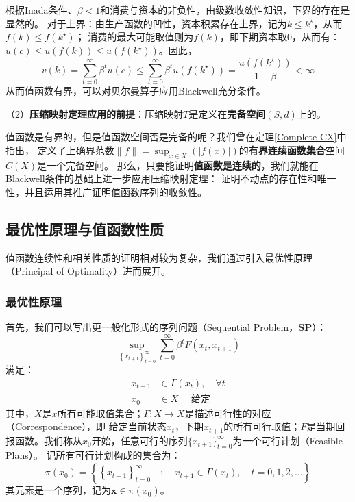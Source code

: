 根据Inada条件、$\beta < 1$和消费与资本的非负性，由级数收敛性知识，下界的存在是显然的。
对于上界：由生产函数的凹性，资本积累存在上界，记为$k \leq k^{\star}$，从而$f\left(k\right) \leq f\left(k^{\star}\right)$；
消费的最大可能取值则为$f\left(k\right)$，即下期资本取0，从而有：
$u\left(c\right)\leq u\left(f\left(k\right)\right)\leq u\left(f\left(k^{\star}\right)\right)$。因此，
$$
v\left(k\right) = \sum_{t=0}^{\infty} \beta^t u\left(c\right) \leq 
    \sum_{t=0}^{\infty} \beta^t u\left(f\left(k^{\star}\right)\right)
    = \frac{u\left(f\left(k^{\star}\right)\right)}{1-\beta} < \infty
$$
从而值函数有界，可以对贝尔曼算子应用Blackwell充分条件。

（2）\textbf{压缩映射定理应用的前提}：压缩映射$T$是定义在\textbf{完备空间}$\left(S,d\right)$上的。

值函数是有界的，但是值函数空间否是完备的呢？我们曾在定理\ref{Complete-CX}中指出，
定义了上确界范数$\|f\|=\sup _{x \in X}(|f(x)|)$的\textbf{有界连续函数集合}空间$C\left(X\right)$是一个完备空间。
那么，只要能证明\textbf{值函数是连续的}，我们就能在Blackwell条件的基础上进一步应用压缩映射定理：
证明不动点的存在性和唯一性，并且运用其推广证明值函数序列的收敛性。


\subsection{最优性原理与值函数性质} \label{subsec-principal-opt}

值函数连续性和相关性质的证明相对较为复杂，我们通过引入最优性原理（Principal of Optimality）进而展开。

\subsubsection{最优性原理}

首先，我们可以写出更一般化形式的序列问题（Sequential Problem，$\mathbf{SP}$）：
$$
\sup _{\left\{x_{t+1}\right\}_{t=0}^{\infty}} \sum_{t=0}^{\infty} \beta^t F\left(x_t, x_{t+1}\right)
$$
满足：
$$
\begin{aligned}
    x_{t+1} & \in \Gamma\left(x_t\right), \quad \forall t\\
    x_0 & \in X \quad \text { 给定 }
\end{aligned}
$$
其中，$X$是$x$所有可能取值集合；$\Gamma : X \rightarrow X$是描述可行性的对应（Correspondence），即
给定当前状态$x_t$，下期$x_{t+1}$的所有可行取值；$F$是当期回报函数。我们称从$x_0$开始，任意可行的序列$\{x_{t+1}\}_{t=0}^{\infty}$为一个可行计划（Feasible Plans）。
记所有可行计划构成的集合为：
$$\pi\left(x_0\right)=\left\{\left\{x_{t+1}\right\}_{t=0}^{\infty} \quad: \quad x_{t+1} \in \Gamma\left(x_t\right), \quad t=0,1,2, \ldots\right\}$$
其元素是一个序列，记为$\boldsymbol{x}\in\pi\left(x_0\right)$。

